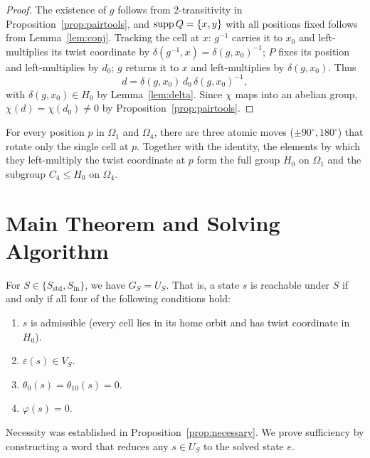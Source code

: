 \documentclass[a4paper,11pt]{article}
\begin{document}
\begin{proof}
The existence of $g$ follows from 2-transitivity in Proposition~\ref{prop:pairtools}, and $\operatorname{supp} Q=\{x,y\}$ with all positions fixed follows from Lemma~\ref{lem:conj}.
Tracking the cell at $x$: $g^{-1}$ carries it to $x_0$ and left-multiplies its twist coordinate by $\delta(g^{-1},x)=\delta(g,x_0)^{-1}$; $P$ fixes its position and left-multiplies by $d_0$; $g$ returns it to $x$ and left-multiplies by $\delta(g,x_0)$. Thus
\[
d=\delta(g,x_0)\,d_0\,\delta(g,x_0)^{-1},
\]
with $\delta(g,x_0)\in H_0$ by Lemma~\ref{lem:delta}.
Since $\chi$ maps into an abelian group, $\chi(d)=\chi(d_0)\ne0$ by Proposition~\ref{prop:pairtools}.
\end{proof}

\begin{proposition}\label{prop:rolls}
For every position $p$ in $\Omega_1$ and $\Omega_4$, there are three atomic moves ($\pm90^\circ,180^\circ$) that rotate only the single cell at $p$.
Together with the identity, the elements by which they left-multiply the twist coordinate at $p$ form the full group $H_0$ on $\Omega_1$ and the subgroup $C_4\le H_0$ on $\Omega_4$.
\end{proposition}

\section{Main Theorem and Solving Algorithm}\label{sec:algorithm}

\begin{theorem}\label{thm:main}
For $S\in\{S_{\mathrm{std}},S_{\mathrm{in}}\}$, we have $G_S=U_S$.
That is, a state $s$ is reachable under $S$ if and only if all four of the following conditions hold:
\begin{enumerate}
\item $s$ is admissible (every cell lies in its home orbit and has twist coordinate in $H_0$).
\item $\varepsilon(s)\in V_S$.
\item $\theta_0(s)=\theta_{10}(s)=0$.
\item $\varphi(s)=0$.
\end{enumerate}
\end{theorem}

Necessity was established in Proposition~\ref{prop:necessary}. We prove sufficiency by constructing a word that reduces any $s\in U_S$ to the solved state $e$.
\end{document}
